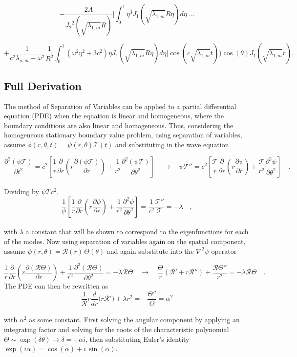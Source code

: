 \documentclass{homework}
\begin{document}
$$ - \frac{2A}{{J_2}^2 \left( \sqrt{\lambda_{1,m}} R \right)}\Bigg[ \int_0^1 \eta^3 J_1 \left( \sqrt{\lambda_{1,m}} R\eta \right) d\eta \; \dots $$

$$ + \frac{1}{c^2 \lambda_{n,m} - \omega^2} \frac{1}{R^2} \int_0^1 \left(\omega^2 \eta^2 + 3c^2 \right) \eta J_1 \left(\sqrt{\lambda_{1,m}} R \eta \right) d\eta \Bigg] \cos \left(c \sqrt{\lambda_{1,m}} t \right) \Biggl) \cos(\theta) J_1 \left(\sqrt{\lambda_{1,m} } r \right) .$$

\subsection{Full Derivation}
\noindent The method of Separation of Variables can be applied to a partial differential equation (PDE) when the equation is linear and homogeneous, where the boundary conditions are also linear and homogeneous. Thus, considering the homogeneous stationary boundary value problem, using separation of variables, assume $\phi(r, \theta, t) = \psi (r, \theta) \mathcal{T} (t)$ and substituting in the wave equation

\[ \frac{\partial^2 (\psi \mathcal{T})}{\partial t^2} = c^2 \left[ \frac{1}{r} \frac{\partial}{\partial r} \left(r \frac{\partial (\psi \mathcal{T})}{\partial r}\right) + \frac{1}{r^2} \frac{\partial^2 (\psi \mathcal{T})}{\partial \theta^2} \right] \quad \rightarrow \quad \psi \mathcal{T}'' = c^2 \left[ \frac{\mathcal{T}}{r} \frac{\partial}{\partial r} \left(r \frac{\partial \psi}{\partial r}\right) + \frac{\mathcal{T}}{r^2} \frac{\partial^2 \psi}{\partial \theta^2} \right] \quad .\]
\\ \noindent
Dividing by $\psi \mathcal{T} c^2$,
\[ \frac{1}{\psi} \left[ \frac{1}{r} \frac{\partial}{\partial r} \left(r \frac{\partial \psi}{\partial r}\right) + \frac{1}{r^2} \frac{\partial^2 \psi}{\partial \theta^2} \right] = \frac{1}{c^2} \frac{\mathcal{T}''}{\mathcal{T}} = - \lambda \quad ,\]
\\ \noindent
with $\lambda$ a constant that will be shown to correspond to the eigenfunctions for each of the modes. Now using separation of variables again on the spatial component, assume $ \psi (r, \theta) = \mathcal{R}(r) \, \Theta(\theta) $ and again substitute into the $\nabla^2 \psi$ operator

\[ \frac{1}{r} \frac{\partial}{\partial r} \left(r \frac{\partial (\mathcal{R} \Theta)}{\partial r}\right) + \frac{1}{r^2} \frac{\partial^2 (\mathcal{R} \Theta)}{\partial \theta^2} = - \lambda \mathcal{R} \Theta \quad \rightarrow \quad \frac{\Theta}{r} (\mathcal{R}' + r \mathcal{R}'') + \frac{\mathcal{R} \Theta''}{r^2} = - \lambda \mathcal{R} \Theta \quad .\]
\noindent
The PDE can then be rewritten as
\[ \frac{1}{\mathcal{R}} r \frac{d}{dr} \big(r \mathcal{R'} \big) + \lambda r^2 = -\frac{\Theta''}{\Theta}  = \alpha^2 \]
\\ \noindent
with $\alpha^2$ as some constant. First solving the angular component by applying an integrating factor and solving for the roots of the characteristic polynomial $\Theta \sim \exp(\delta \theta) \rightarrow \delta = \pm \alpha i$, then substituting Euler's identity $\exp(i \alpha) = \cos(\alpha) + i \, \sin(\alpha)$. 
\end{document}
